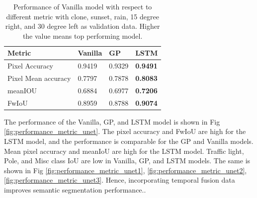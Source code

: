 	\begin{table}
		\begin{center}
			\begin{tabular}{ | l | p{4cm} | p{4cm} | p{4cm} |}
				\hline
				
				\cellcolor{purple!30}Metric & \cellcolor{purple!30}Vanilla & \cellcolor{purple!30}GP & \cellcolor{purple!30}LSTM\\ \hline
				Pixel Accuracy & 0.9419 & 0.9329 & {\bf 0.9491} \\ \hline
				Pixel Mean accuracy & 0.7797 & 0.7878 & {\bf 0.8083}  \\ \hline
				meanIOU & 0.6884 & 0.6977 & {\bf 0.7206} \\ \hline
				FwIoU & 0.8959 & 0.8788 & {\bf 0.9074} \\ \hline
				\hline
			\end{tabular}
			\caption{Performance of Vanilla model with respect to different metric with clone, sunset, rain, 15 degree right, and 30 degree left as validation data. Higher the value means top performing model.}
			\label{table:Vanilla_conti_seq}
		\end{center}
	\end{table}
	
	The performance of the Vanilla, GP, and LSTM model is shown in Fig \ref{fig:performance_metric_unet}. The pixel accuracy and  FwIoU are high for the LSTM model, and the performance is comparable for the GP and Vanilla models. Mean pixel accuracy and meanIoU are high for the LSTM model. Traffic light, Pole, and Misc class IoU are low in Vanilla, GP, and LSTM models. The same is shown in Fig \ref{fig:performance_metric_unet1}, \ref{fig:performance_metric_unet2}, \ref{fig:performance_metric_unet3}. Hence, incorporating temporal fusion data improves semantic segmentation performance.. 

